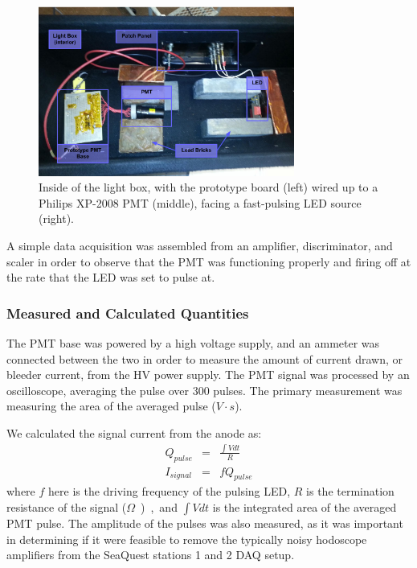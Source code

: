 \begin{figure}
	\centerline{
		\mbox{\includegraphics[width=0.75\textwidth]{figures/pmtupgrade/LightBox.pdf}}
	}
	\caption{Inside of the light box, with the prototype board (left) wired up to a Philips XP-2008 PMT (middle), facing a fast-pulsing LED source (right).}
	\label{fig:pmtsetup}
\end{figure}

A simple data acquisition was assembled from an amplifier, discriminator, and scaler in order to observe that the PMT was functioning properly and firing off at the rate that the LED was set to pulse at.

\subsubsection{Measured and Calculated Quantities}

The PMT base was powered by a high voltage supply, and an ammeter was connected between the two in order to measure the amount of current drawn, or bleeder current, from the HV power supply. The PMT signal was processed by an oscilloscope, averaging the pulse over 300 pulses. The primary measurement was measuring the area of the averaged pulse ($V\cdot s$).

We calculated the signal current from the anode as:
\begin{eqnarray}
Q_{pulse} & = & \frac{\int V dt}{R} \\
I_{signal} & = & f Q_{pulse}
\end{eqnarray}
where $f$ here is the driving frequency of the pulsing LED, $R$ is the termination resistance of the signal (\unit[50]{$\Omega$}), and $\int V dt$ is the integrated area of the averaged PMT pulse. The amplitude of the pulses was also measured, as it was important in determining if it were feasible to remove the typically noisy hodoscope amplifiers from the SeaQuest stations 1 and 2 DAQ setup.

